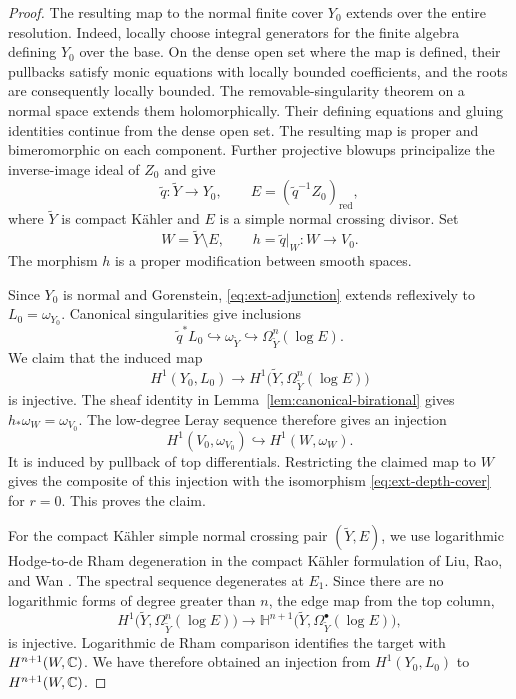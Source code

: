 \documentclass[11pt,a4paper]{article}
\theoremstyle{definition}\newtheorem{definition}[theorem]{Definition}
\theoremstyle{remark}\newtheorem*{remark}{Remark}
\begin{document}
\begin{proof}
The resulting map to the normal finite cover $Y_0$ extends over the entire
resolution. Indeed, locally choose integral generators for the finite
algebra defining $Y_0$ over the base. On the dense open set where the map
is defined, their pullbacks satisfy monic equations with locally bounded
coefficients, and the roots are consequently locally bounded.
The removable-singularity theorem on a normal space extends them
holomorphically. Their defining equations and gluing identities continue
from the dense open set. The resulting map is proper and bimeromorphic
on each component. Further projective blowups principalize the
inverse-image ideal of $Z_0$ and give
\[
 \widetilde q:\widetilde Y\to Y_0,\qquad
 E=(\widetilde q^{-1}Z_0)_{\mathrm{red}},
\]
where $\widetilde Y$ is compact Kähler and $E$ is a simple normal crossing
divisor. Set
\[
 W=\widetilde Y\setminus E,\qquad
 h=\widetilde q|_W:W\longrightarrow V_0.
\]
The morphism $h$ is a proper modification between smooth spaces.

Since $Y_0$ is normal and Gorenstein,
\eqref{eq:ext-adjunction} extends reflexively to $L_0=\omega_{Y_0}$.
Canonical singularities give inclusions
\[
 \widetilde q^*L_0
 \hookrightarrow \omega_{\widetilde Y}
 \hookrightarrow \Omega^n_{\widetilde Y}(\log E).
\]
We claim that the induced map
\[
 H^1(Y_0,L_0)\longrightarrow
 H^1\bigl(\widetilde Y,\Omega^n_{\widetilde Y}(\log E)\bigr)
\]
is injective. The sheaf identity in
Lemma~\ref{lem:canonical-birational} gives
$h_*\omega_W=\omega_{V_0}$. The low-degree Leray sequence therefore
gives an injection
\[
 H^1(V_0,\omega_{V_0})\hookrightarrow H^1(W,\omega_W).
\]
It is induced by pullback of top differentials. Restricting the claimed
map to $W$ gives the composite of this injection with the isomorphism
\eqref{eq:ext-depth-cover} for $r=0$. This proves the claim.

For the compact Kähler simple normal crossing pair $(\widetilde Y,E)$,
we use logarithmic Hodge-to-de Rham degeneration in the compact Kähler
formulation of Liu, Rao, and Wan \cite[Theorem~3.2]{LRW2019}.
The spectral sequence degenerates at $E_1$.
Since there are no logarithmic forms of degree greater than $n$, the
edge map from the top column,
\[
 H^1\bigl(\widetilde Y,\Omega^n_{\widetilde Y}(\log E)\bigr)
 \longrightarrow
 \mathbb H^{n+1}\bigl(\widetilde Y,\Omega^\bullet_{\widetilde Y}(\log E)\bigr),
\]
is injective. Logarithmic de Rham comparison
\cite[Section~3.2]{LRW2019} identifies the target with
$H^{n+1}(W,\mathbb C)$. We have therefore obtained an injection from
$H^1(Y_0,L_0)$ to $H^{n+1}(W,\mathbb C)$.


\end{proof}
\end{document}
